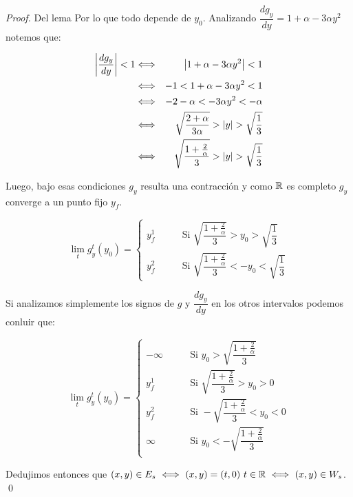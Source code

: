 \begin{example}
\begin{proof}{Del lema}
		Por lo que todo depende de $y_0$. Analizando $\dfrac{d g_y}{dy} = 1 + \alpha - 3\alpha y^2$ notemos que:
		
		\begin{equation*}
		\begin{aligned}
		\left\lvert\dfrac{d g_y}{dy}\right\rvert < 1  & \Longleftrightarrow & \left\lvert1 + \alpha - 3\alpha y^2\right\rvert < 1 \\
		& \Longleftrightarrow & -1 < 1 + \alpha - 3\alpha y^2 < 1 \\
		& \Longleftrightarrow &  -2 - \alpha < -3 \alpha y^2 < -\alpha \\
		& \Longleftrightarrow &  \sqrt{\dfrac{2 + \alpha}{3\alpha}} > \left\lvert y\right\rvert > \sqrt{\dfrac{1}{3}} \\
		& \Longleftrightarrow &  \sqrt{\dfrac{1 + \frac{2}{\alpha}}{3}} > \left\lvert y\right\rvert > \sqrt{\dfrac{1}{3}}
		\end{aligned}
		\end{equation*}
		
		Luego, bajo esas condiciones $g_y$ resulta una contracci\'on y como ${\mathbb{R}}$ es completo $g_y$ converge a un punto fijo $y_f$.
		
		\begin{equation*}
		\lim\limits_t g_y^t(y_0) = \left\lbrace \begin{aligned}
		y_f^1 & \qquad \text{Si } \sqrt{\dfrac{1 + \frac{2}{\alpha}}{3}} > y_0 > \sqrt{\dfrac{1}{3}} \\
		y_f^2 & \qquad \text{Si } \sqrt{\dfrac{1 + \frac{2}{\alpha}}{3}} < -y_0 < \sqrt{\dfrac{1}{3}}
		\end{aligned} \right.
		\end{equation*}
		
		Si analizamos simplemente los signos de $g$ y $\dfrac{d g_y}{dy}$ en los otros intervalos podemos conluir que:
		
		\begin{equation*}
		\lim\limits_t g_y^t(y_0) = \left\lbrace \begin{aligned}
		-\infty & \qquad \text{Si } y_0 >  \sqrt{\dfrac{1 + \frac{2}{\alpha}}{3}} \\
		y_f^1 & \qquad \text{Si } \sqrt{\dfrac{1 + \frac{2}{\alpha}}{3}} > y_0 > 0 \\
		y_f^2 & \qquad \text{Si } -\sqrt{\dfrac{1 + \frac{2}{\alpha}}{3}} < y_0 < 0 \\
		\infty & \qquad \text{Si } y_0 < -\sqrt{\dfrac{1 + \frac{2}{\alpha}}{3}} \\
		\end{aligned} \right.
		\end{equation*}
		
		Dedujimos entonces que $(x,y) \in E_s \ \Longleftrightarrow \ (x,y) = (t,0) \ t \in \R \ \Longleftrightarrow \ (x,y) \in W_s$. \qed
		
	\end{proof}
	
\end{example}

